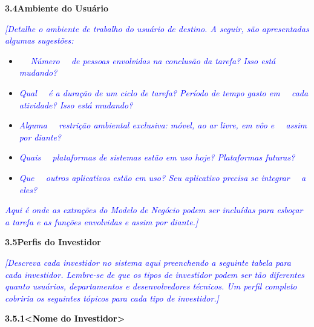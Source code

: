 \documentclass[a4paper]{article}
\newcommand\liststyleWWNumi{%
\renewcommand\labelitemi{${\bullet}$}
\renewcommand\labelitemii{${\circ}$}
\renewcommand\labelitemiii{${\blacksquare}$}
\renewcommand\labelitemiv{${\bullet}$}
}
\begin{document}
\bigskip


\bigskip

\hypertarget{wbxdw99bjw1b}{}\textbf{3.4Ambiente do Usu\'ario}

\textit{\textcolor{blue}{[Detalhe o ambiente de trabalho do usu\'ario de destino. A seguir, s\~ao apresentadas algumas
sugest\~oes:}}

\liststyleWWNumi
\begin{itemize}
\item \ \ \newline
 \textit{\textcolor{blue}{N\'umero \ \ de pessoas envolvidas na conclus\~ao da tarefa? Isso est\'a mudando?\newline
}} \ \ 
\item \textit{\textcolor{blue}{Qual \ \ \'e a dura\c{c}\~ao de um ciclo de tarefa? Per\'iodo de tempo gasto em \ \ cada
atividade? Isso est\'a mudando?\newline
}} \ \ 
\item \textit{\textcolor{blue}{Alguma \ \ restri\c{c}\~ao ambiental exclusiva: m\'ovel, ao ar livre, em v\^oo e
\ \ assim por diante?\newline
}} \ \ 
\item \textit{\textcolor{blue}{Quais \ \ plataformas de sistemas est\~ao em uso hoje? Plataformas futuras?\newline
}} \ \ 
\item \textit{\textcolor{blue}{Que \ \ outros aplicativos est\~ao em uso? Seu aplicativo precisa se integrar \ \ a
eles?\newline
}}
\end{itemize}
\textit{\textcolor{blue}{Aqui \'e onde as extra\c{c}\~oes do Modelo de Neg\'ocio podem ser inclu\'idas para esbo\c{c}ar
a tarefa e as fun\c{c}\~oes envolvidas e assim por diante.]}}

\hypertarget{9h7ts32xj51n}{}\textbf{3.5Perfis do Investidor}

\textit{\textcolor{blue}{[Descreva cada investidor no sistema aqui preenchendo a seguinte tabela para cada investidor.
Lembre-se de que os tipos de investidor podem ser t\~ao diferentes quanto usu\'arios, departamentos e desenvolvedores
t\'ecnicos. Um perfil completo cobriria os seguintes t\'opicos para cada tipo de investidor.]}}

{\color[rgb]{0.2627451,0.2627451,0.2627451}
\hypertarget{qn8n5a4zkm95}{}\textbf{\textcolor{black}{3.5.1{\textless}Nome do Investidor{\textgreater}}}}


\bigskip
\end{document}
